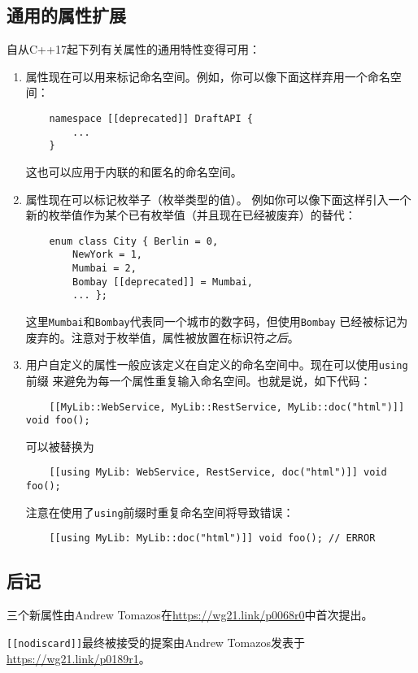 \subsection{通用的属性扩展}
自从C++17起下列有关属性的通用特性变得可用：
\begin{enumerate}[leftmargin=*]
    \item 属性现在可以用来标记命名空间。例如，你可以像下面这样弃用一个命名空间：
    \begin{lstlisting}
    namespace [[deprecated]] DraftAPI {
        ...
    }
    \end{lstlisting}
    这也可以应用于内联的和匿名的命名空间。
    \item 属性现在可以标记枚举子（枚举类型的值）。
    例如你可以像下面这样引入一个新的枚举值作为某个已有枚举值（并且现在已经被废弃）的替代：
    \begin{lstlisting}
    enum class City { Berlin = 0,
        NewYork = 1,
        Mumbai = 2,
        Bombay [[deprecated]] = Mumbai,
        ... };
    \end{lstlisting}
    这里\texttt{Mumbai}和\texttt{Bombay}代表同一个城市的数字码，但使用\texttt{Bombay}
    已经被标记为废弃的。注意对于枚举值，属性被放置在标识符\emph{之后}。
    \item 用户自定义的属性一般应该定义在自定义的命名空间中。现在可以使用\texttt{using}前缀
    来避免为每一个属性重复输入命名空间。也就是说，如下代码：
    \begin{lstlisting}
    [[MyLib::WebService, MyLib::RestService, MyLib::doc("html")]] void foo();
    \end{lstlisting}
    可以被替换为
    \begin{lstlisting}
    [[using MyLib: WebService, RestService, doc("html")]] void foo();
    \end{lstlisting}
    注意在使用了\texttt{using}前缀时重复命名空间将导致错误：
    \begin{lstlisting}
    [[using MyLib: MyLib::doc("html")]] void foo(); // ERROR
    \end{lstlisting}
\end{enumerate}

\subsection{后记}
三个新属性由Andrew Tomazos在\url{https://wg21.link/p0068r0}中首次提出。

\texttt{[[nodiscard]]}最终被接受的提案由Andrew Tomazos发表于
\url{https://wg21.link/p0189r1}。

